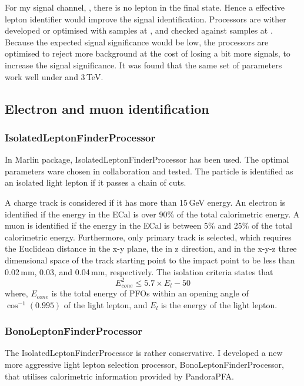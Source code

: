 For my signal channel, \eeToHHbbWW, there is no lepton in the final state. Hence a effective lepton identifier would improve the signal identification. Processors are wither developed or optimised with samples at , and checked against samples at . Because the expected signal significance would be low, the processors are optimised to reject more background at the cost of losing a bit more signals, to increase the signal significance. It was found that the same set of parameters work well under  and 3\,TeV.



\subsection{Electron and muon identification}
\label{sec:doubleHiggsLeptonID}


\subsubsection{IsolatedLeptonFinderProcessor}

In Marlin package, IsolatedLeptonFinderProcessor has been used. The optimal parameters ware chosen in collaboration and tested. The particle is identified as an isolated light lepton if it passes a chain of cuts.

A charge track is considered if it has more than 15\,GeV energy. An electron is identified if the energy in the ECal is over 90\% of the total calorimetric energy. A muon is identified if the energy in the ECal is between 5\% and 25\% of the total calorimetric energy. Furthermore, only primary track is selected, which requires the Euclidean distance in the x-y plane, the in z direction, and in the x-y-z three dimensional space of the track starting point to the impact point to be less than 0.02\,mm, 0.03\mm, and  0.04\,mm, respectively. The isolation criteria states that
\begin{equation}
E_{cone}^2 \leqslant 5.7 \times E_{l} - 50
\end{equation}
where, $E_{cone}$ is the total energy of PFOs within an opening angle of $\cos^{-1}(0.995)$ of the light lepton, and $E_{l}$ is the energy of the light lepton.

\subsubsection{BonoLeptonFinderProcessor}

The IsolatedLeptonFinderProcessor is rather conservative. I developed a new more aggressive light lepton selection processor, BonoLeptonFinderProcessor, that utilises calorimetric information provided by PandoraPFA.

